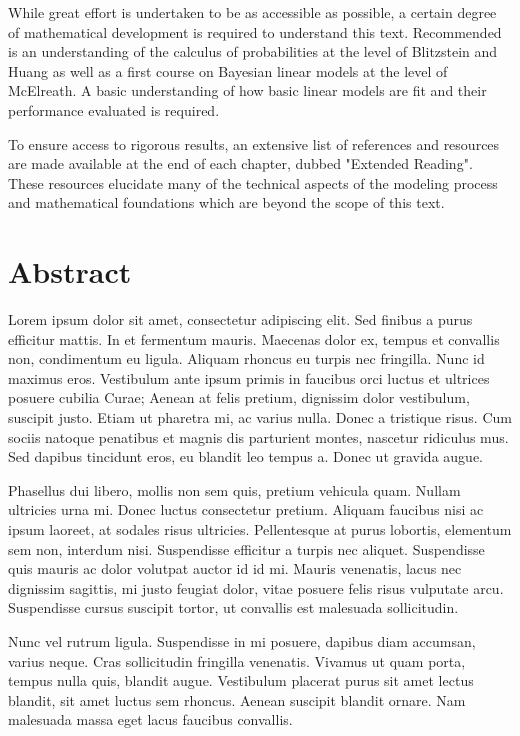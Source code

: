 While great effort is undertaken to be as accessible as possible, a certain degree of mathematical development is required to understand this text. Recommended is an understanding of the calculus of probabilities at the level of Blitzstein and Huang\cite{Blitzstein2014} as well as a first course on Bayesian linear models at the level of McElreath\cite{McElreath2016}. A basic understanding of how basic linear models are fit and their performance evaluated is required.

To ensure access to rigorous results, an extensive list of references and resources are made available at the end of each chapter, dubbed "Extended Reading". These resources elucidate many of the technical aspects of the modeling process and mathematical foundations which are beyond the scope of this text.

\newpage

\section*{Abstract}

Lorem ipsum dolor sit amet, consectetur adipiscing elit. Sed finibus a purus efficitur mattis. In et fermentum mauris. Maecenas dolor ex, tempus et convallis non, condimentum eu ligula. Aliquam rhoncus eu turpis nec fringilla. Nunc id maximus eros. Vestibulum ante ipsum primis in faucibus orci luctus et ultrices posuere cubilia Curae; Aenean at felis pretium, dignissim dolor vestibulum, suscipit justo. Etiam ut pharetra mi, ac varius nulla. Donec a tristique risus. Cum sociis natoque penatibus et magnis dis parturient montes, nascetur ridiculus mus. Sed dapibus tincidunt eros, eu blandit leo tempus a. Donec ut gravida augue.

Phasellus dui libero, mollis non sem quis, pretium vehicula quam. Nullam ultricies urna mi. Donec luctus consectetur pretium. Aliquam faucibus nisi ac ipsum laoreet, at sodales risus ultricies. Pellentesque at purus lobortis, elementum sem non, interdum nisi. Suspendisse efficitur a turpis nec aliquet. Suspendisse quis mauris ac dolor volutpat auctor id id mi. Mauris venenatis, lacus nec dignissim sagittis, mi justo feugiat dolor, vitae posuere felis risus vulputate arcu. Suspendisse cursus suscipit tortor, ut convallis est malesuada sollicitudin.

Nunc vel rutrum ligula. Suspendisse in mi posuere, dapibus diam accumsan, varius neque. Cras sollicitudin fringilla venenatis. Vivamus ut quam porta, tempus nulla quis, blandit augue. Vestibulum placerat purus sit amet lectus blandit, sit amet luctus sem rhoncus. Aenean suscipit blandit ornare. Nam malesuada massa eget lacus faucibus convallis.

